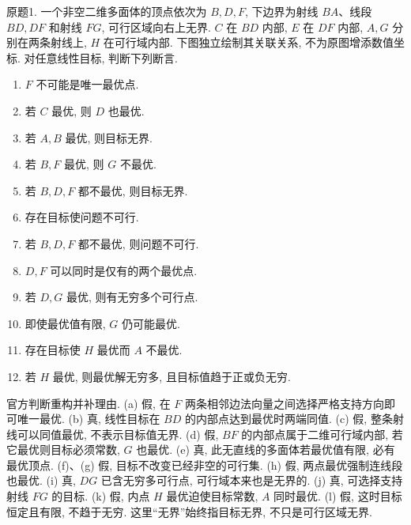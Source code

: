 \begin{exercise}\label{ass:15053-rec2-q1}
原题1. 一个非空二维多面体的顶点依次为 $B,D,F$, 下边界为射线 $BA$、线段 $BD,DF$ 和射线 $FG$, 可行区域向右上无界. $C$ 在 $BD$ 内部, $E$ 在 $DF$ 内部, $A,G$ 分别在两条射线上, $H$ 在可行域内部. 下图独立绘制其关联关系, 不为原图增添数值坐标. 对任意线性目标, 判断下列断言.
\begin{center}\end{center}
\begin{enumerate}[label=(\alph*)]
\item $F$ 不可能是唯一最优点.
\item 若 $C$ 最优, 则 $D$ 也最优.
\item 若 $A,B$ 最优, 则目标无界.
\item 若 $B,F$ 最优, 则 $G$ 不最优.
\item 若 $B,D,F$ 都不最优, 则目标无界.
\item 存在目标使问题不可行.
\item 若 $B,D,F$ 都不最优, 则问题不可行.
\item $D,F$ 可以同时是仅有的两个最优点.
\item 若 $D,G$ 最优, 则有无穷多个可行点.
\item 即使最优值有限, $G$ 仍可能最优.
\item 存在目标使 $H$ 最优而 $A$ 不最优.
\item 若 $H$ 最优, 则最优解无穷多, 且目标值趋于正或负无穷.
\end{enumerate}
\end{exercise}
\begin{solution}
官方判断重构并补理由. (a) 假, 在 $F$ 两条相邻边法向量之间选择严格支持方向即可唯一最优. (b) 真, 线性目标在 $BD$ 的内部点达到最优时两端同值. (c) 假, 整条射线可以同值最优, 不表示目标值无界. (d) 假, $BF$ 的内部点属于二维可行域内部, 若它最优则目标必须常数, $G$ 也最优. (e) 真, 此无直线的多面体若最优值有限, 必有最优顶点. (f)、(g) 假, 目标不改变已经非空的可行集. (h) 假, 两点最优强制连线段也最优. (i) 真, $DG$ 已含无穷多可行点, 可行域本来也是无界的. (j) 真, 可选择支持射线 $FG$ 的目标. (k) 假, 内点 $H$ 最优迫使目标常数, $A$ 同时最优. (l) 假, 这时目标恒定且有限, 不趋于无穷. 这里“无界”始终指目标无界, 不只是可行区域无界.
\end{solution}

